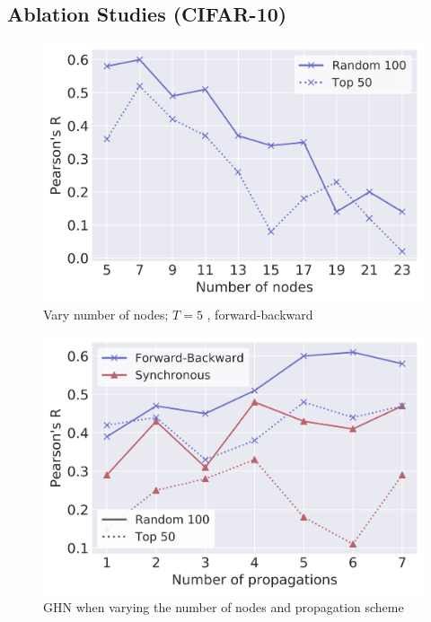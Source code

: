 \subsection{Ablation Studies (CIFAR-10)}
\label{section:ablations}

\iflatexml
\begin{figure}
  \includegraphics[width=4\linewidth]{figures/nodes.png}
  \caption{Vary number of nodes; $T=5$ , forward-backward}
  \label{fig:sfig2}
\end{figure}
\begin{figure}
  \includegraphics[width=4\linewidth]{figures/tsteps.png}
\caption{ GHN when varying the number of nodes and propagation scheme}
  \label{fig:sfig1}
\end{figure}
\else
